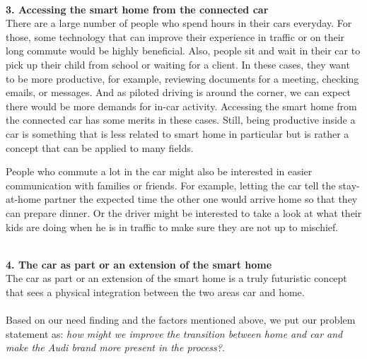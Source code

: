\noindent
\\\textbf{3. Accessing the smart home from the connected car}
\\There are a large number of people who spend hours in their cars everyday. For those, some technology that can improve their experience in traffic or on their long commute would be highly beneficial. Also, people sit and wait in their car to pick up their child from school or waiting for a client. In these cases, they want to be more productive, for example, reviewing documents for a meeting, checking emails, or messages. And as 
piloted driving is around the corner, we can expect there would be more demands for in-car activity. Accessing the smart home from the connected car has some merits in these cases. Still, being productive inside a car is something that is less related to smart home in particular but is rather a concept that can be applied to many fields.

People who commute a lot in the car might also be interested in easier communication with families or friends. For example, letting the car tell the stay-at-home partner the expected time the other one would arrive home so that they can prepare dinner. Or the driver might be interested to take a look at what their kids are doing when he is in traffic to make sure they are not up to mischief.

\noindent
\\\textbf{4. The car as part or an extension of the smart home}
\\The car as part or an extension of the smart home is a truly futuristic concept that sees a physical integration between the two areas car and home. 
\\\\
Based on our need finding and the factors mentioned above, we put our problem statement as: \textit{how might we improve the transition between home and car and make the Audi brand more present in the process?}.